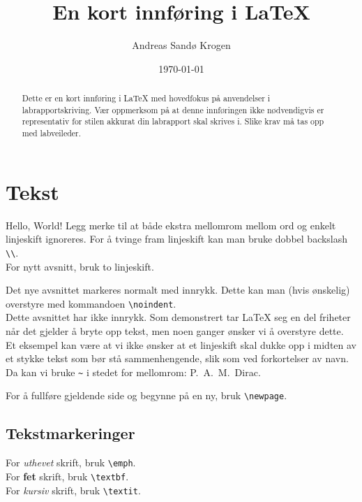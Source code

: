 \documentclass[a4paper,11pt]{article}
\author{Andreas Sandø Krogen}
\date{\today}
\title{En kort innføring i \LaTeX}
\begin{document}
\maketitle

\begin{abstract}
Dette er en kort innføring i \LaTeX{} med hovedfokus på anvendelser i labrapportskriving. Vær oppmerksom på at denne innføringen ikke nødvendigvis er representativ for stilen akkurat din labrapport skal skrives i. Slike krav må tas opp med labveileder.
\end{abstract}

\section{Tekst}
Hello, World!
Legg merke til at både ekstra mellomrom    mellom ord og enkelt linjeskift ignoreres.
For å tvinge fram linjeskift kan man bruke dobbel backslash \texttt{\textbackslash\textbackslash}. \\
For nytt avsnitt, bruk to linjeskift.

Det nye avsnittet markeres normalt med innrykk. Dette kan man (hvis ønskelig) overstyre med kommandoen \texttt{\textbackslash noindent}.\\

\noindent Dette avsnittet har ikke innrykk. Som demonstrert tar \LaTeX{} seg en del friheter når det gjelder å bryte opp tekst, men noen ganger ønsker vi å overstyre dette. Et eksempel kan være at vi ikke ønsker at et linjeskift skal dukke opp i midten av et stykke tekst som bør stå sammenhengende, slik som ved forkortelser av navn. Da kan vi bruke \texttt{\textasciitilde} i stedet for mellomrom: P.~A.~M.~Dirac.

For å fullføre gjeldende side og begynne på en ny, bruk \texttt{\textbackslash newpage}.


\subsection*{Tekstmarkeringer}
For \emph{uthevet} skrift, bruk \texttt{\textbackslash emph}.\\
For \textbf{fet} skrift, bruk \texttt{\textbackslash textbf}.\\
For \textit{kursiv} skrift, bruk \texttt{\textbackslash textit}.
\end{document}
